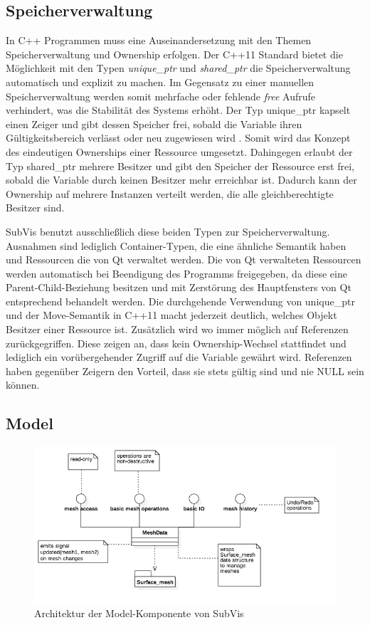 \subsection{Speicherverwaltung}

In C++ Programmen muss eine Auseinandersetzung mit den Themen Speicherverwaltung und Ownership erfolgen.
Der C++11 Standard bietet die Möglichkeit mit den Typen \emph{unique\_ptr} und \emph{shared\_ptr} die Speicherverwaltung automatisch und explizit zu machen.
Im Gegensatz zu einer manuellen Speicherverwaltung werden somit mehrfache oder fehlende \emph{free} Aufrufe verhindert, was die Stabilität des Systems erhöht.
Der Typ unique\_ptr kapselt einen Zeiger und gibt dessen Speicher frei, sobald die Variable ihren Gültigkeitsbereich verlässt oder neu zugewiesen wird \cite{C++Ref}. 
Somit wird das Konzept des eindeutigen Ownerships einer Ressource umgesetzt.
Dahingegen erlaubt der Typ shared\_ptr mehrere Besitzer und gibt den Speicher der Ressource erst frei, sobald die Variable durch keinen Besitzer mehr erreichbar ist.
Dadurch kann der Ownership auf mehrere Instanzen verteilt werden, die alle gleichberechtigte Besitzer sind.

SubVis benutzt ausschließlich diese beiden Typen zur Speicherverwaltung.
Ausnahmen sind lediglich Container-Typen, die eine ähnliche Semantik haben und Ressourcen die von Qt verwaltet werden.
Die von Qt verwalteten Ressourcen werden automatisch bei Beendigung des Programms freigegeben, da diese eine Parent-Child-Beziehung besitzen und mit Zerstörung des Hauptfensters von Qt entsprechend behandelt werden.
Die durchgehende Verwendung von unique\_ptr und der Move-Semantik in C++11 macht jederzeit deutlich, welches Objekt Besitzer einer Ressource ist.
Zusätzlich wird wo immer möglich auf Referenzen zurückgegriffen.
Diese zeigen an, dass kein Ownership-Wechsel stattfindet und lediglich ein vorübergehender Zugriff auf die Variable gewährt wird.
Referenzen haben gegenüber Zeigern den Vorteil, dass sie stets gültig sind und nie NULL sein können.

\subsection{Model}

\begin{figure}
  \centering
  \includegraphics[width=\textwidth]{content/media/subvis_architektur_model.png}
  \caption{Architektur der Model-Komponente von SubVis}
  \label{fig:subvis_architektur_model}
\end{figure}

